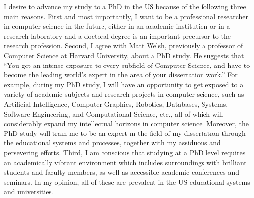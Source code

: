 \documentclass[a4paper,10pt]{report}
\begin{document}
\vspace{0.2cm}
I desire to advance my study to a PhD in the US because of the following three main reasons. First and most importantly, I want to be a professional researcher in computer science in the future, either in an academic institution or in a research laboratory and a doctoral degree is an important precursor to the research profession. Second, I agree with Matt Welsh, previously a professor of Computer Science at Harvard University, about a PhD study. He suggests that ``You get an intense exposure to every subfield of Computer Science, and have to become the leading world's expert in the area of your dissertation work.'' For example, during my PhD study, I will have an opportunity to get exposed to a variety of academic subjects and research projects in computer science, such as Artificial Intelligence, Computer Graphics, Robotics, Databases, Systems, Software Engineering, and Computational Science, etc., all of which will considerably expand my intellectual horizons in computer science. Moreover, the PhD study will train me to be an expert in the field of my dissertation through the educational systems and processes, together with my assiduous and persevering efforts. Third, I am conscious that studying at a PhD level requires an academically vibrant environment which includes surroundings with brilliant students and faculty members, as well as accessible academic conferences and seminars. In my opinion, all of these are prevalent in the US educational systems and universities.
\end{document}
